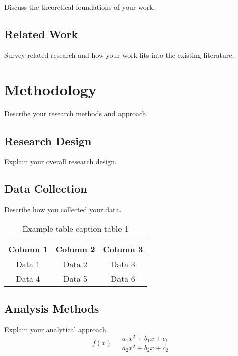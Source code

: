Discuss the theoretical foundations of your work.

\section{Related Work}

Survey-related research and how your work fits into the existing literature.

\chapter{Methodology}

Describe your research methods and approach.

\section{Research Design}

Explain your overall research design.

\section{Data Collection}

Describe how you collected your data.

\begin{table}[ht]
    \centering
    \begin{tabular}{|c|c|c|}
        \hline
        Column 1 & Column 2 & Column 3 \\
        \hline
        Data 1 & Data 2 & Data 3 \\
        Data 4 & Data 5 & Data 6 \\
        \hline
    \end{tabular}
    \caption{Example table caption table 1}
    \label{tab:example1}
\end{table}

\section{Analysis Methods}

Explain your analytical approach.
\begin{equation}
    f(x) = \frac{a_1 x^2 + b_1 x + c_1}{a_2 x^2 + b_2 x + c_2}
\end{equation}

